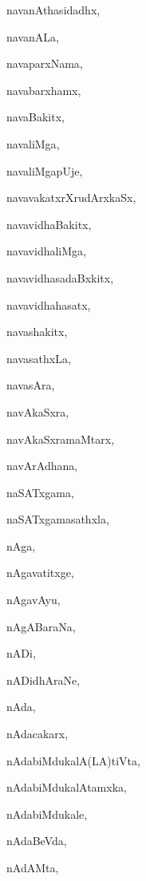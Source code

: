 \begin{multicols}{2}
{navanAthasidadhx}, \pageref{navanAthasidadhx}

{navanALa}, \pageref{navanALa}

{navaparxNama}, \pageref{navaparxNama}

{navabarxhamx}, \pageref{navabarxhamx}

{navaBakitx}, \pageref{navaBakitx}

{navaliMga}, \pageref{navaliMga}

{navaliMgapUje}, \pageref{navaliMgapUje}

{navavakatxrXrudArxkaSx}, \pageref{navavakatxrXrudArxkaSx}

{navavidhaBakitx}, \pageref{navavidhaBakitx}

{navavidhaliMga}, \pageref{navavidhaliMga}

{navavidhasadaBxkitx}, \pageref{navavidhasadaBxkitx}

{navavidhahasatx}, \pageref{navavidhahasatx}

{navashakitx}, \pageref{navashakitx}

{navasathxLa}, \pageref{navasathxLa}

{navasAra}, \pageref{navasAra}

{navAkaSxra}, \pageref{navAkaSxra}

{navAkaSxramaMtarx}, \pageref{navAkaSxramaMtarx}

{navArAdhana}, \pageref{navArAdhana}

{naSATxgama}, \pageref{naSATxgama}

{naSATxgamasathxla}, \pageref{naSATxgamasathxla}

{nAga}, \pageref{nAga}

{nAgavatitxge}, \pageref{nAgavatitxge}

{nAgavAyu}, \pageref{nAgavAyu}

{nAgABaraNa}, \pageref{nAgABaraNa}

{nADi}, \pageref{nADi}

{nADidhAraNe}, \pageref{nADidhAraNe}

{nAda}, \pageref{nAda}

{nAdacakarx}, \pageref{nAdacakarx}

{nAdabiMdukalA(LA)tiVta}, \pageref{nAdabiMdukalALAtiVta}

{nAdabiMdukalAtamxka}, \pageref{nAdabiMdukalAtamxka}

{nAdabiMdukale}, \pageref{nAdabiMdukale}

{nAdaBeVda}, \pageref{nAdaBeVda}

{nAdAMta}, \pageref{nAdAMta}


\end{multicols}
